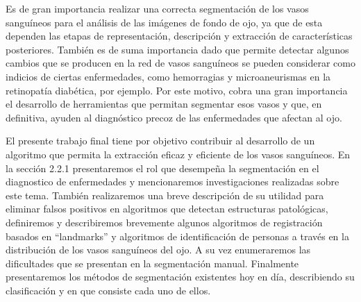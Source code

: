 Es de gran importancia realizar una correcta segmentaci\'on de los vasos sangu\'ineos para el an\'alisis de las im\'agenes de fondo de ojo, ya que de esta dependen las etapas de representaci\'on, descripci\'on y extracci\'on de caracter\'isticas posteriores.  Tambi\'en es de suma importancia dado que permite detectar algunos cambios que se producen en la red de vasos sangu\'ineos se pueden considerar como indicios de ciertas enfermedades, como hemorragias y microaneurismas en la retinopat\'ia diab\'etica, por ejemplo. Por este motivo, cobra una gran importancia el desarrollo de herramientas que permitan segmentar esos vasos y que, en definitiva, ayuden al diagn\'ostico precoz de las enfermedades que afectan al ojo.

El presente trabajo final tiene por objetivo contribuir al desarrollo de un algoritmo que permita la extracci\'on eficaz y eficiente de los vasos sangu\'ineos. 
En la sección 2.2.1 presentaremos el rol que desempeña la segmentaci\'on en el diagnostico de enfermedades y mencionaremos investigaciones realizadas sobre este tema.  Tambi\'en realizaremos una breve descripci\'on de su utilidad para eliminar falsos positivos en algoritmos que detectan estructuras patol\'ogicas, definiremos y describiremos brevemente algunos algoritmos de registraci\'on basados en “landmarks” y algoritmos de identificaci\'on de personas a trav\'es en la distribuci\'on de los vasos sangu\'ineos del ojo.  A su vez enumeraremos las dificultades que se presentan en la segmentaci\'on manual. Finalmente presentaremos los m\'etodos de segmentaci\'on existentes hoy en d\'ia, describiendo su clasificaci\'on y en que consiste cada uno de ellos.




